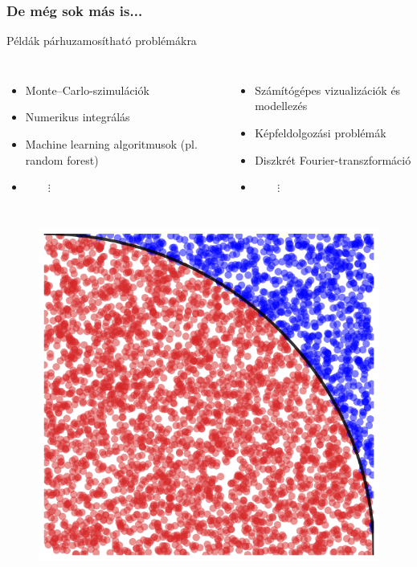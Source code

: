 \begin{frame}
\frametitle{De még sok más is...}

\begin{block}{Példák párhuzamosítható problémákra}
	\begin{columns}
		\begin{itemize}
			\item Monte--Carlo-szimulációk
			\item Numerikus integrálás
			\item Machine learning algoritmusok (pl. random forest)
			\item[] $\qquad \vdots$
		\end{itemize}
		
		\begin{itemize}
			\item Számítógépes vizualizációk és modellezés
			\item Képfeldolgozási problémák
			\item Diszkrét Fourier-transzformáció
			\item[] $\qquad \vdots$
		\end{itemize}
	\end{columns}
\end{block}

\begin{columns}
	\column{0.3\linewidth}
	\begin{figure}
		\includegraphics[width=\textwidth]{img/monte_carlo.png}
	\end{figure}	
	

\end{columns}
\end{frame}
